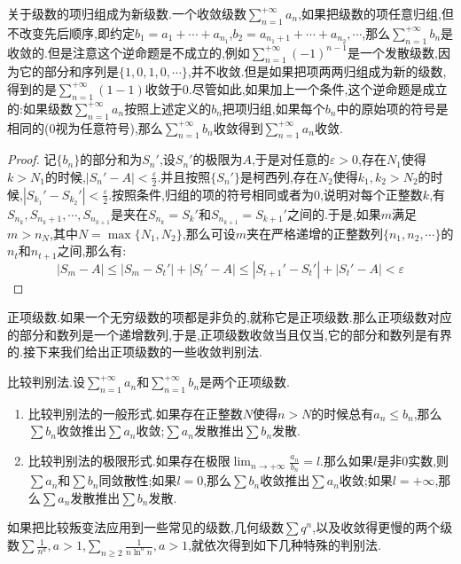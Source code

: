关于级数的项归组成为新级数.一个收敛级数$\sum_{n=1}^{+\infty}a_n$,如果把级数的项任意归组,但不改变先后顺序,即约定$b_1=a_1+\cdots+a_{n_1}$,$b_2=a_{n_1+1}+\cdots+a_{n_2},\cdots$,那么$\sum_{n=1}^{+\infty}b_n$是收敛的.但是注意这个逆命题是不成立的,例如$\sum_{n=1}^{+\infty}(-1)^{n-1}$是一个发散级数,因为它的部分和序列是$\{1,0,1,0,\cdots\}$,并不收敛.但是如果把项两两归组成为新的级数,得到的是$\sum_{n=1}^{+\infty}(1-1)$收敛于0.尽管如此,如果加上一个条件,这个逆命题是成立的:如果级数$\sum_{n=1}^{+\infty}a_n$按照上述定义的$b_n$把项归组,如果每个$b_n$中的原始项的符号是相同的(0视为任意符号),那么$\sum_{n=1}^{+\infty}b_n$收敛得到$\sum_{n=1}^{+\infty}a_n$收敛.
\begin{proof}
	
	记$\{b_n\}$的部分和为$S_n'$,设$S_n'$的极限为$A$,于是对任意的$\varepsilon>0$,存在$N_1$使得$k>N_1$的时候,$\left|S_n'-A\right|<\frac{\varepsilon}{2}$.并且按照$\{S_n'\}$是柯西列,存在$N_2$使得$k_1,k_2>N_2$的时候,$\left|S_{k_1}'-S_{k_2}'\right|<\frac{\varepsilon}{2}$.按照条件,归组的项的符号相同或者为0,说明对每个正整数$k$,有$S_{n_k},S_{n_k+1},\cdots,S_{n_{k+1}}$是夹在$S_{n_k}=S_{k}'$和$S_{n_{k+1}}=S_{k+1}'$之间的.于是,如果$m$满足$m>n_N$,其中$N=\max\{N_1,N_2\}$,那么可设$m$夹在严格递增的正整数列$\{n_1,n_2,\cdots\}$的$n_{t}$和$n_{t+1}$之间,那么有:
	$$\left|S_m-A\right|\le\left|S_m-S_t'\right|+\left|S_t'-A\right|\le\left|S_{t+1}'-S_t'\right|+\left|S_t'-A\right|<\varepsilon$$
	
\end{proof}

正项级数.如果一个无穷级数的项都是非负的,就称它是正项级数.那么正项级数对应的部分和数列是一个递增数列,于是,正项级数收敛当且仅当,它的部分和数列是有界的.接下来我们给出正项级数的一些收敛判别法.

比较判别法.设$\sum_{n=1}^{+\infty}a_n$和$\sum_{n=1}^{+\infty}b_n$是两个正项级数.
\begin{enumerate}
	\item 比较判别法的一般形式.如果存在正整数$N$使得$n>N$的时候总有$a_n\le b_n$,那么$\sum b_n$收敛推出$\sum a_n$收敛;$\sum a_n$发散推出$\sum b_n$发散.
	\item 比较判别法的极限形式.如果存在极限$\lim_{n\to+\infty}\frac{a_n}{b_n}=l$.那么如果$l$是非0实数,则$\sum a_n$和$\sum b_n$同敛散性;如果$l=0$,那么$\sum b_n$收敛推出$\sum a_n$收敛;如果$l=+\infty$,那么$\sum a_n$发散推出$\sum b_n$发散.
\end{enumerate}

如果把比较叛变法应用到一些常见的级数,几何级数$\sum q^n$,以及收敛得更慢的两个级数$\sum\frac{1}{n^{a}},a>1$,$\sum_{n\ge2}\frac{1}{n\ln^an},a>1$,就依次得到如下几种特殊的判别法.

